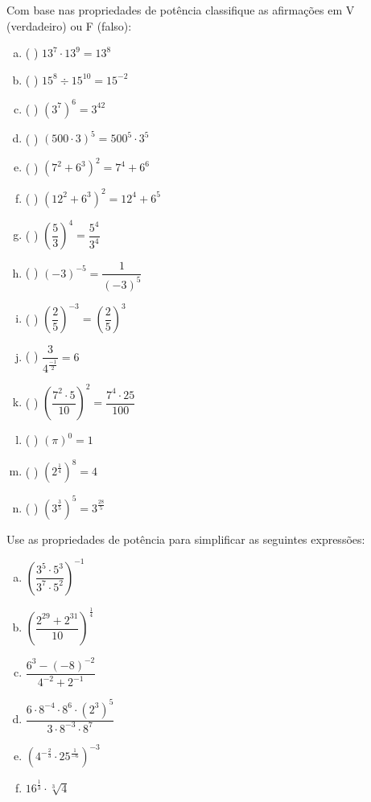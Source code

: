 \begin{exer}
Com base nas propriedades de potência classifique as afirmações em V (verdadeiro) ou F (falso):
\begin{multicols}{2}
\begin{enumerate}[a)]
\item ( ) $13^7 \cdot 13^9= 13^{8}$
\item ( ) $15^8 \div 15^{10}= 15^{-2}$
\item ( ) $(3^7)^6= 3^{42}$
\item ( ) $(500 \cdot 3)^5= 500^5 \cdot 3^5$
\item ( ) $(7^2 + 6^3)^2= 7^4 + 6^6$
\item ( ) $(12^2 + 6^3)^2= 12^4 + 6^5$
\item ( ) $\left(\dfrac{5}{3} \right)^4= \dfrac{5^4}{3^4}$
\item ( ) $(-3)^{-5}= \dfrac{1}{(-3)^5}$
\item ( ) $\left(\dfrac{2}{5}\right)^{-3}= \left(\dfrac{2}{5}\right)^{3}$
\item ( ) $\dfrac{3}{4^{\frac{-1}{2}}}= 6$
\item ( ) $\left(\dfrac{7^2 \cdot 5}{10}\right)^{2}= \dfrac{7^4 \cdot 25}{100}$
\item ( ) $(\pi)^0= 1$
\item ( ) $(2^{\frac{1}{4}})^8= 4$
\item ( ) $(3^{\frac{3}{5}})^5= 3^{\frac{28}{5}}$
\end{enumerate}
\end{multicols}
\end{exer}
\begin{resp}
  \construirResp
\end{resp}

\begin{exer}
 Use as propriedades de potência para simplificar as seguintes expressões:
\begin{multicols}{2}
\begin{enumerate}[a)]
\item $\left( \dfrac{3^5 \cdot 5^3}{3^7 \cdot 5^2} \right)^{-1}$
\item $\left( \dfrac{2^{29} + 2^{31}}{10} \right)^{\frac{1}{4}}$
\item $\dfrac{6^3 - (-8)^{-2}}{4^{-2} + 2^{-1}}$
\item $\dfrac{6 \cdot 8^{-4} \cdot 8^{6} \cdot (2^3)^{5}}{3 \cdot 8^{-3} \cdot 8^{7}}$
\item $\left(4^{-\frac{2}{3}} \cdot 25^{\frac{1}{-6}}\right)^{-3}$
\item $16^{\frac{1}{3}} \cdot \sqrt[3]{4}$
\end{enumerate}
\end{multicols}
\end{exer}
\begin{resp}
  \construirResp
\end{resp}

